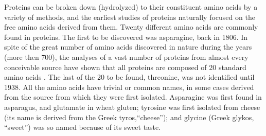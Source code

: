 Proteins can be broken down (hydrolyzed) to their constituent amino acids by a variety of methods, and the earliest studies of proteins naturally focused on the free amino acids derived from them. Twenty different amino acids are commonly found in proteins. The first to be discovered was asparagine, back in 1806. 
In spite of the great number of amino acids discovered in nature during the years (more then 700), the analyses of a vast number of proteins from almost every conceivable source have shown that all proteins are composed of 20 standard amino acids
\cite{wu2013amino}. 
The last of the 20 to be found, threonine, was not identified until 1938. All the amino acids have trivial or common names, in some cases derived from the source from which they were first isolated. Asparagine was first found in asparagus, and glutamate in wheat gluten; tyrosine was first isolated from cheese (its name is derived from the Greek tyros,``cheese''); and glycine (Greek glykos, ``sweet'') was so named because of its sweet taste.
\cite{nelson2008lehninger}

